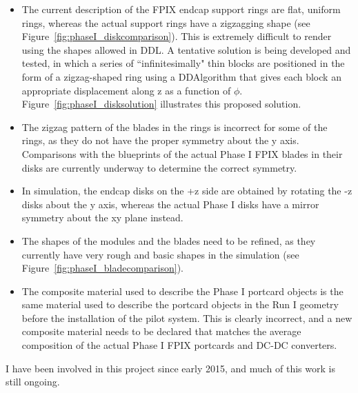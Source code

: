 \begin{itemize}
\item The current description of the FPIX endcap support rings are flat, uniform rings, whereas the actual support rings have a zigzagging shape (see Figure~\ref{fig:phaseI_diskcomparison}). This is extremely difficult to render using the shapes allowed in DDL. A tentative solution is being developed and tested, in which a series of ``infinitesimally" thin blocks are positioned in the form of a zigzag-shaped ring using a DDAlgorithm that gives each block an appropriate displacement along z as a function of $\phi$. Figure~\ref{fig:phaseI_disksolution} illustrates this proposed solution.
\item The zigzag pattern of the blades in the rings is incorrect for some of the rings, as they do not have the proper symmetry about the y axis. Comparisons with the blueprints of the actual Phase I FPIX blades in their disks are currently underway to determine the correct symmetry.
\item In simulation, the endcap disks on the +z side are obtained by rotating the -z disks about the y axis, whereas the actual Phase I disks have a mirror symmetry about the xy plane instead.
\item The shapes of the modules and the blades need to be refined, as they currently have very rough and basic shapes in the simulation (see Figure~\ref{fig:phaseI_bladecomparison}).
\item The composite material used to describe the Phase I portcard objects is the same material used to describe the portcard objects in the Run I geometry before the installation of the pilot system. This is clearly incorrect, and a new composite material needs to be declared that matches the average composition of the actual Phase I FPIX portcards and DC-DC converters.
\end{itemize}

I have been involved in this project since early 2015, and much of this work is still ongoing.

